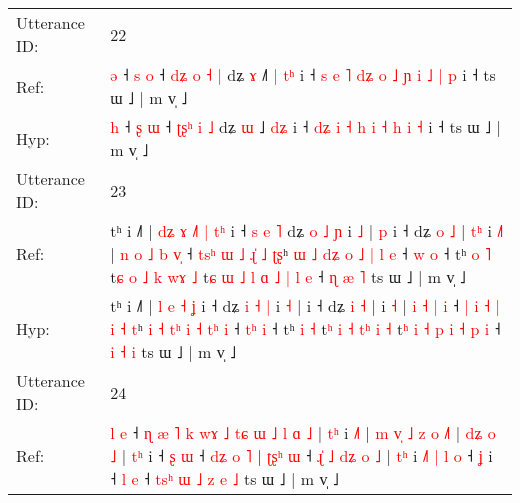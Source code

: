 \documentclass[10pt]{article}
\DeclareRobustCommand{\hl}[1]{{\textcolor{red}{#1}}}
\begin{document}
\begin{longtable}{ll}
 \\
\midrule
Utterance ID: & 22 \\
Ref: & \hl{ə} ˧ \hl{s} \hl{o} ˧ \hl{d}\hl{ʑ}\hl{ }\hl{o} \hl{˧} \hl{|} dʑ \hl{ɤ} ˩\hl{˥}\hl{ }\hl{|} \hl{t}\hl{ʰ} i ˧\hl{ }\hl{s} \hl{e}\hl{ }\hl{˥} \hl{d}\hl{ʑ} \hl{o} \hl{˩} \hl{ɲ} \hl{i} \hl{˩} \hl{|} \hl{p} i ˧ ts ɯ ˩ | m v̩ ˩
 \\
Hyp: & \hl{h} ˧ \hl{ʂ} \hl{ɯ} ˧ \hl{}\hl{ʈ}\hl{ʂ}\hl{ʰ} \hl{i} \hl{˩} dʑ \hl{ɯ} ˩\hl{}\hl{}\hl{} \hl{d}\hl{ʑ} i ˧\hl{}\hl{} \hl{}\hl{d}\hl{ʑ} \hl{}\hl{i} \hl{˧} \hl{h} \hl{i} \hl{˧} \hl{h} \hl{i} \hl{˧} i ˧ ts ɯ ˩ | m v̩ ˩
 \\
\midrule
Utterance ID: & 23 \\
Ref: & tʰ i ˩˥ |\hl{ }\hl{d}\hl{ʑ} \hl{ɤ} \hl{˩}\hl{˥} \hl{|} \hl{t}\hl{ʰ} i ˧\hl{ }\hl{s}\hl{ }\hl{e}\hl{ }\hl{˥} dʑ \hl{o} \hl{˩} \hl{ɲ} i \hl{˩} |\hl{ }\hl{p} i ˧ dʑ \hl{o} \hl{˩} |\hl{ }\hl{t}\hl{ʰ} i \hl{˩}\hl{˥} |\hl{ }\hl{n} \hl{o} \hl{˩} \hl{b} \hl{v}\hl{̩} ˧ \hl{t}\hl{s}\hl{ʰ} \hl{ɯ} \hl{˩} \hl{ɻ}\hl{̍} \hl{˩} \hl{ʈ}\hl{ʂ}ʰ \hl{ɯ} \hl{˩} \hl{d}\hl{ʑ} \hl{o} \hl{˩} \hl{|}\hl{ }\hl{l} \hl{e} ˧ \hl{}\hl{w} \hl{o} ˧ tʰ \hl{o} \hl{˥} t\hl{ɕ} \hl{o} \hl{˩} \hl{k}\hl{ }\hl{w}\hl{ɤ} \hl{˩} t\hl{ɕ}\hl{ }\hl{ɯ} \hl{˩} \hl{l} \hl{ɑ} \hl{˩} \hl{|} \hl{l} \hl{e} ˧ \hl{ɳ} \hl{æ} \hl{˥} ts ɯ ˩ | m v̩ ˩
 \\
Hyp: & tʰ i ˩˥ |\hl{}\hl{}\hl{} \hl{l} \hl{}\hl{e} \hl{˧} \hl{}\hl{ʝ} i ˧\hl{}\hl{}\hl{}\hl{}\hl{}\hl{} dʑ \hl{i} \hl{˧} \hl{|} i \hl{˧} |\hl{}\hl{} i ˧ dʑ \hl{i} \hl{˧} |\hl{}\hl{}\hl{} i \hl{}\hl{˧} |\hl{}\hl{} \hl{i} \hl{˧} \hl{|} \hl{}\hl{i} ˧ \hl{|}\hl{ }\hl{i} \hl{˧} \hl{|} \hl{}\hl{i} \hl{˧} \hl{}\hl{t}ʰ \hl{i} \hl{˧} \hl{t}\hl{ʰ} \hl{i} \hl{˧} \hl{}\hl{t}\hl{ʰ} \hl{i} ˧ \hl{t}\hl{ʰ} \hl{i} ˧ tʰ \hl{i} \hl{˧} t\hl{ʰ} \hl{i} \hl{˧} \hl{t}\hl{ʰ}\hl{ }\hl{i} \hl{˧} t\hl{}\hl{}\hl{ʰ} \hl{i} \hl{˧} \hl{p} \hl{i} \hl{˧} \hl{p} \hl{i} ˧ \hl{i} \hl{˧} \hl{i} ts ɯ ˩ | m v̩ ˩
 \\
\midrule
Utterance ID: & 24 \\
Ref: & \hl{l} \hl{e} ˧\hl{ }\hl{ɳ}\hl{ }\hl{æ}\hl{ }\hl{˥} \hl{k} \hl{w}\hl{ɤ} \hl{˩} \hl{t}\hl{ɕ} \hl{ɯ} \hl{˩} \hl{l} \hl{ɑ} \hl{˩} |\hl{ }\hl{t}\hl{ʰ} i \hl{˩}\hl{˥} |\hl{ }\hl{m} \hl{v}\hl{̩} \hl{˩} \hl{z} \hl{o} \hl{˩}\hl{˥} |\hl{ }\hl{d}\hl{ʑ} \hl{o} \hl{˩} |\hl{ }\hl{t}\hl{ʰ} i ˧ \hl{ʂ} \hl{ɯ} ˧ \hl{d}\hl{ʑ} \hl{o} \hl{˥} |\hl{ }\hl{ʈ}\hl{ʂ}\hl{ʰ} \hl{ɯ} ˧\hl{ }\hl{ɻ}\hl{̍}\hl{ }\hl{˩} \hl{d}\hl{ʑ} \hl{o} \hl{˩} |\hl{ }\hl{t}\hl{ʰ} i\hl{ }\hl{˩}\hl{˥} \hl{|} \hl{l} \hl{o} ˧ \hl{ʝ} i ˧ \hl{l} \hl{e} ˧\hl{ }\hl{t}\hl{s}\hl{ʰ} \hl{ɯ} \hl{˩} \hl{z} \hl{e} \hl{˩} ts ɯ ˩ | m v̩ ˩

\end{longtable}
\end{document}
